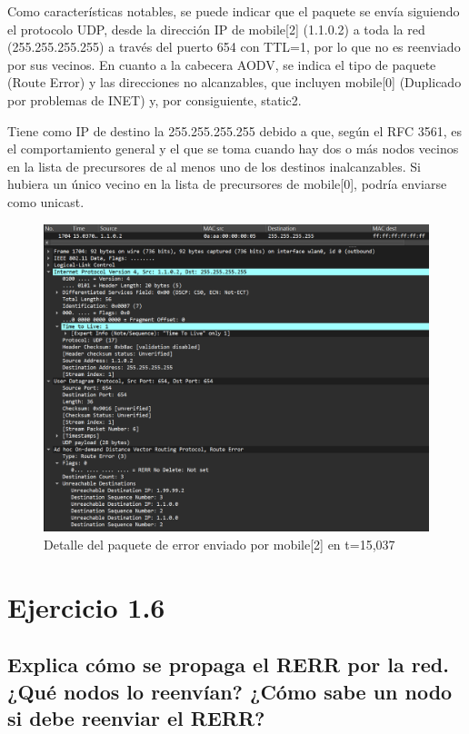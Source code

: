 Como características notables, se puede indicar que el paquete se envía siguiendo el protocolo UDP, desde la dirección IP de mobile[2] (1.1.0.2) a toda la red (255.255.255.255) a través del puerto 654 con TTL=1, por lo que no es reenviado por sus vecinos. En cuanto a la cabecera AODV, se indica el tipo de paquete (Route Error) y las direcciones no alcanzables, que incluyen mobile[0] (Duplicado por problemas de INET) y, por consiguiente, static2.

Tiene como IP de destino la 255.255.255.255 debido a que, según el RFC 3561, es el comportamiento general y el que se toma cuando hay dos o más nodos vecinos en la lista de precursores de al menos uno de los destinos inalcanzables. Si hubiera un único vecino en la lista de precursores de mobile[0], podría enviarse como unicast.

\begin{figure}[H]
    \centering
    \includegraphics[width=125mm, scale=0.75]{imaxes/aodv/ejercicio5_1.png}
    \caption{Detalle del paquete de error enviado por mobile[2] en t=15,037}
    \label{fig:RerrWireshark}
\end{figure}

\vspace{1.25cm}
\section{Ejercicio 1.6}

\subsection{Explica cómo se propaga el RERR por la red. ¿Qué nodos lo reenvían? ¿Cómo sabe un nodo si debe reenviar
el RERR?}

